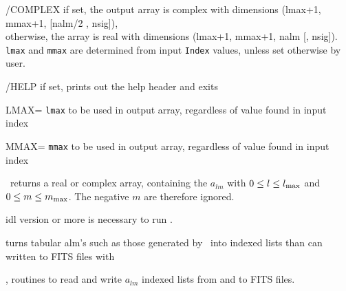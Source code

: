 \begin{keywords}
  \begin{kwlist}{} %
    \item[/COMPLEX] %
if set, the output array is complex with dimensions
          (lmax+1, mmax+1, [nalm/2 , nsig]),\\
      otherwise, the array is real with dimensions
          (lmax+1, mmax+1, nalm [, nsig]). \\
{\tt lmax} and {\tt mmax} are determined from input {\tt Index} values, unless set otherwise
by user.
    \item[/HELP] %
	if set, prints out the help header and exits
    \item[LMAX=] %
{\tt lmax} to be used in output array, regardless of
      value found in input index
    \item[MMAX=] %
{\tt mmax} to be used in output array, regardless of
      value found in input index
  \end{kwlist}
\end{keywords}  

\begin{codedescription}
{%
\thedocid\ returns a real or complex array, containing the $a_{lm}$ with
$0 \le l \le l_{\rm max}$ and $0 \le m \le m_{\rm max}$. The negative $m$ are
therefore ignored.
}
\end{codedescription}



\begin{related}
  \begin{sulist}{} %
    \item[idl] version \idlversion or more is necessary to run \thedocid.
    \item[\htmlref{alm\_t2i}{idl:alm_t2i}] turns tabular alm's such as those generated by
\thedocid\ into indexed lists than can written to FITS files with
  \item[\htmlref{alm2fits}{idl:alm2fits}, \htmlref{fits2alm}{idl:fits2alm}]
routines to read and write $a_{lm}$ indexed lists from and to FITS files.
  \end{sulist}
\end{related}

